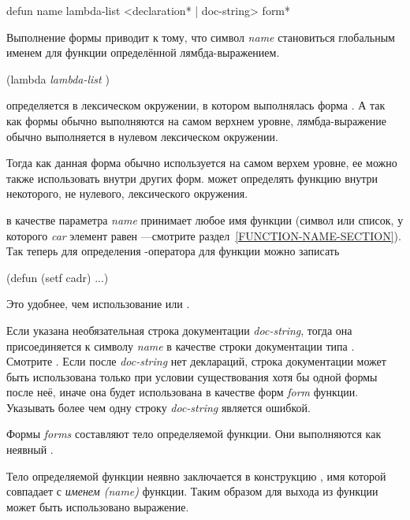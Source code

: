 \begin{defmac}
defun name lambda-list
  <{declaration}* | doc-string>
  {form}*

Выполнение формы  приводит к тому, что символ \emph{name}
становиться глобальным именем для функции определённой лямбда-выражением.
\begin{lisp}
(lambda \emph{lambda-list}  )
\end{lisp}
определяется в лексическом окружении, в котором выполнялась форма
. А так как формы  обычно выполняются на самом верхнем
уровне, лямбда-выражение обычно выполняется в нулевом лексическом окружении.

Тогда как данная форма обычно используется на самом верхем уровне, ее можно
также использовать внутри других форм.  может определять функцию
внутри некоторого, не нулевого, лексического окружения.

 в качестве параметра \emph{name} принимает любое имя функции (символ
или список, у которого \emph{car} элемент равен ---смотрите
раздел~\ref{FUNCTION-NAME-SECTION}).
Так теперь для определения -оператора для функции  можно записать
\begin{lisp}
(defun (setf cadr) ...)
\end{lisp}
Это удобнее, чем использование  или .

Если указана необязательная строка документации \emph{doc-string}, тогда она
присоединяется к символу \emph{name} в качестве строки документации типа
. Смотрите . Если после \emph{doc-string} нет
деклараций, строка документации может быть использована только при условии
существования хотя бы одной формы после неё, иначе она будет использована в
качестве форм \emph{form} функции. Указывать более чем одну строку
\emph{doc-string} является ошибкой.

Формы \emph{forms} составляют тело определяемой функции. Они выполняются как
неявный .

Тело определяемой функции неявно заключается в конструкцию , имя
которой совпадает с \emph{именем (name)} функции. Таким образом для выхода из функции
может быть использовано выражение.


\end{defmac}
